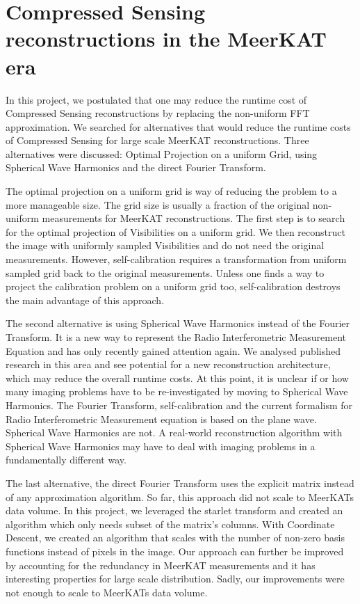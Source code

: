 \section{Compressed Sensing reconstructions in the MeerKAT era}
In this project, we postulated that one may reduce the runtime cost of Compressed Sensing reconstructions by replacing the non-uniform FFT approximation. We searched for alternatives that would reduce the runtime costs of Compressed Sensing for large scale MeerKAT reconstructions. Three alternatives were discussed: Optimal Projection on a uniform Grid, using Spherical Wave Harmonics and the direct Fourier Transform.

The optimal projection on a uniform grid is way of reducing the problem to a more manageable size. The grid size is usually a fraction of the original non-uniform measurements for MeerKAT reconstructions. The first step is to search for the optimal projection of Visibilities on a uniform grid. We then reconstruct the image with uniformly sampled Visibilities and do not need the original measurements. However, self-calibration requires a transformation from uniform sampled grid back to the original measurements. Unless one finds a way to project the calibration problem on a uniform grid too, self-calibration destroys the main advantage of this approach.

The second alternative is using Spherical Wave Harmonics instead of the Fourier Transform. It is a new way to represent the Radio Interferometric Measurement Equation and has only recently gained attention again. We analysed published research in this area\cite{carozzi2015imaging, mcewen2008simulating} and see potential for a new reconstruction architecture, which may reduce the overall runtime costs. At this point, it is unclear if or how many imaging problems have to be re-investigated by moving to Spherical Wave Harmonics. The Fourier Transform, self-calibration and the current formalism for Radio Interferometric Measurement equation is based on the plane wave\cite{smirnov2011revisiting}. Spherical Wave Harmonics are not. A real-world reconstruction algorithm with Spherical Wave Harmonics may have to deal with imaging problems in a fundamentally different way.

The last alternative, the direct Fourier Transform uses the explicit matrix instead of any approximation algorithm. So far, this approach did not scale to MeerKATs data volume. In this project, we leveraged the starlet transform and created an algorithm which only needs subset of the matrix's columns. With Coordinate Descent, we created an algorithm that scales with the number of non-zero basis functions instead of pixels in the image. Our approach can further be improved by accounting for the redundancy in MeerKAT measurements and it has interesting properties for large scale distribution. Sadly, our improvements were not enough to scale to MeerKATs data volume. 

